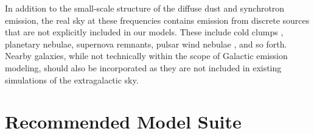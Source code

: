 \documentclass[twocolumn]{aastex631}
\begin{document}
In addition to the small-scale structure of the diffuse dust and synchrotron emission, the real sky at these frequencies contains emission from discrete sources that are not explicitly included in our models. These include cold clumps \citep{Clancy:2023}, planetary nebulae, supernova remnants, pulsar wind nebulae \citep{Guan:2021}, and so forth. Nearby galaxies, while not technically within the scope of Galactic emission modeling, should also be incorporated as they are not included in existing simulations of the extragalactic sky.




\section{Recommended Model Suite}\label{sec:modelsuite}
\end{document}
